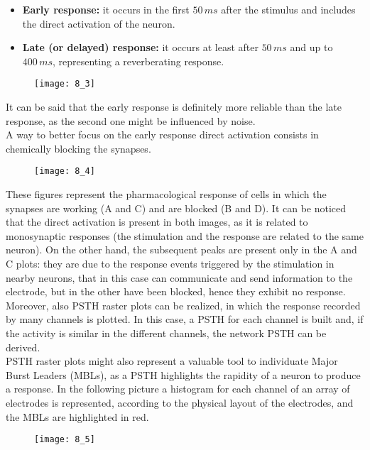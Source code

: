 \begin{itemize}
    \item \textbf{Early response:} it occurs in the first \(50\,ms\) after the stimulus
          and includes the direct activation of the neuron.
    \item \textbf{Late (or delayed) response:} it occurs at least after \(50\,ms\) and up to
          \(400\,ms\), representing a reverberating response.
\end{itemize}
\begin{figure}[H]
    \texttt{[image: 8\_3]}
    \centering
\end{figure}
It can be said that the early response is definitely more reliable than the late
response, as the second one might be influenced by noise.\\
A way to better focus on the early response direct activation consists in chemically
blocking the synapses.
\begin{figure}[H]
    \texttt{[image: 8\_4]}
    \centering
\end{figure}
These figures represent the pharmacological response of cells in which the synapses are
working (A and C) and are blocked (B and D). It can be noticed that the direct activation is
present in both images, as it is related to monosynaptic responses (the stimulation and the
response are related to the same neuron). On the other hand, the subsequent peaks are
present only in the A and C plots: they are due to the response events triggered by the
stimulation in nearby neurons, that in this case can communicate and send information to
the electrode, but in the other have been blocked, hence they exhibit no response.\\
Moreover, also PSTH raster plots can be realized, in which the response recorded by many
channels is plotted. In this case, a PSTH for each channel is built and, if the activity is
similar in the different channels, the network PSTH can be derived.\\
PSTH raster plots might also represent a valuable tool to individuate Major Burst
Leaders (MBLs), as a PSTH highlights the rapidity of a neuron to produce a response. In the
following picture a histogram for each channel of an array of electrodes is represented,
according to the physical layout of the electrodes, and the MBLs are highlighted in red.
\begin{figure}[H]
    \texttt{[image: 8\_5]}
    \centering
\end{figure}


